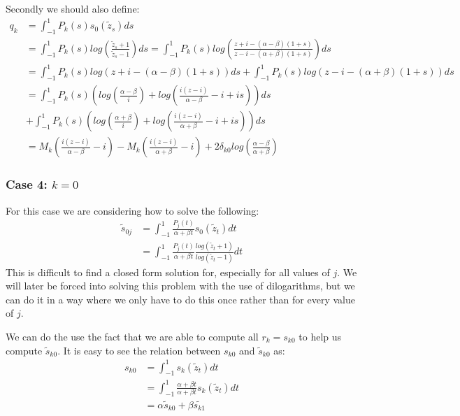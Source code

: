 \documentclass{article}
\begin{document}
Secondly we should also define:
\begin{align}
    q_k&=\int_{-1}^1P_k(s)s_0(\tilde{z}_s)ds\\
    &=\int_{-1}^1P_k(s)log(\frac{\tilde{z}_s+1}{\tilde{z}_s-1})ds
    =\int_{-1}^1P_k(s)log(\frac{z+i-(\alpha-\beta)(1+s)}{z-i-(\alpha+\beta)(1+s)})ds\\
    &=\int_{-1}^1P_k(s)log(z+i-(\alpha-\beta)(1+s))ds+\int_{-1}^1P_k(s)log(z-i-(\alpha+\beta)(1+s))ds\\
    &=\int_{-1}^1P_k(s)(log(\frac{\alpha-\beta}{i})+log(\frac{i(z-i)}{\alpha-\beta}-i+is))ds\\
    &+\int_{-1}^1P_k(s)(log(\frac{\alpha+\beta}{i})+log(\frac{i(z-i)}{\alpha+\beta}-i+is))ds\\
    &=M_k(\frac{i(z-i)}{\alpha-\beta}-i)-M_k(\frac{i(z-i)}{\alpha+\beta}-i)
    +2\delta_{k0}log(\frac{\alpha-\beta}{\alpha+\beta})
\end{align}

\subsubsection*{Case 4: $k=0$}
For this case we are considering how to solve the following:
\begin{align}
    \tilde{s}_{0j} &= \int_{-1}^1\frac{P_j(t)}{\alpha+\beta t}s_0(\tilde{z}_t)dt\\
    &= \int_{-1}^1\frac{P_j(t)}{\alpha+\beta t}\frac{log(\tilde{z}_t+1)}{log(\tilde{z}_t-1)}dt
\end{align}
This is difficult to find a closed form solution for, especially for all values of $j$.
We will later be forced into solving this problem with the use of dilogarithms, but we can do it in a way where we only have to do this once rather than for every value of $j$.

We can do the use the fact that we are able to compute all $r_k=s_{k0}$ to help us compute $\tilde{s}_{k0}$.
It is easy to see the relation between $s_{k0}$ and $\tilde{s}_{k0}$ as:
\begin{align}
    s_{k0}&=\int_{-1}^1s_k(\tilde{z}_t)dt\\
    &=\int_{-1}^1\frac{\alpha+\beta t}{\alpha+\beta t}s_k(\tilde{z}_t)dt\\
    &=\alpha \tilde{s}_{k0} + \beta \tilde{s_{k1}}
\end{align}
\end{document}
